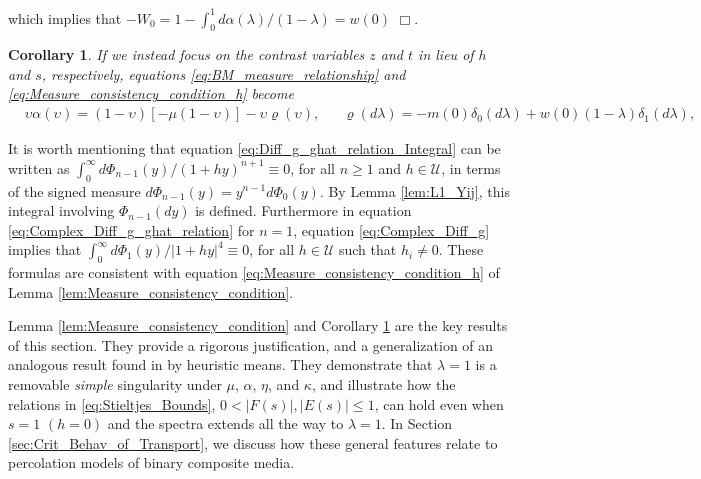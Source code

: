 \documentclass[english,12pt,jmp,graphicx]{revtex4-1}
\newtheorem{corollary}{Corollary}[section]
\begin{document}
%
which implies that $-W_0=1-\int_0^1d\alpha(\lambda)/(1-\lambda)=w(0)$ $\Box$.
%
\begin{corollary}\label{cor:Delta_functions}
%  
  If we instead focus on the contrast variables $z$ and $t$ in lieu of
  $h$ and $s$, respectively, equations
  \eqref{eq:BM_measure_relationship} and
  \eqref{eq:Measure_consistency_condition_h} become  
%
\begin{align}\label{eq:Measure_consistency_condition_z}
%  
 &\upsilon\alpha(\upsilon)=(1-\upsilon)[-\mu(1-\upsilon)] - \upsilon\varrho(\upsilon),
 &&\varrho(d\lambda)=-m(0)\delta_0(d\lambda)+w(0)(1-\lambda)\delta_1(d\lambda),
% 
\end{align}
%  
\end{corollary}
%

 It is worth mentioning 
that equation \eqref{eq:Diff_g_ghat_relation_Integral} can be written
as $\int_0^\infty d\Phi_{n-1}(y)/(1+hy)^{n+1}\equiv0$, for all $n\geq1$ and $h\in\mathcal{U}$, in
terms of the signed measure $d\Phi_{n-1}(y)=y^{n-1}d\Phi_0(y)$. By Lemma
\ref{lem:L1_Yij}, this integral involving 
$\Phi_{n-1}(dy)$ is defined. Furthermore in equation
\eqref{eq:Complex_Diff_g_ghat_relation} for $n=1$, equation
\eqref{eq:Complex_Diff_g} implies that $\int_0^\infty d\Phi_1(y)/|1+hy|^4\equiv0$, for 
all $h\in\mathcal{U}$ such that $h_i\neq0$. These formulas are consistent
with equation \eqref{eq:Measure_consistency_condition_h} of Lemma
\ref{lem:Measure_consistency_condition}.

Lemma \ref{lem:Measure_consistency_condition} and Corollary 
\ref{cor:Delta_functions} are the key results of this section. They
provide a rigorous justification, and a generalization of an
analogous result found in \cite{Day:JPCM-96} by heuristic means. They
demonstrate that $\lambda=1$ is a removable \emph{simple} singularity under
$\mu$, $\alpha$, $\eta$, and $\kappa$, and illustrate how the relations in
\eqref{eq:Stieltjes_Bounds}, $0<|F(s)|,|E(s)|\leq1$, can hold even when
$s=1$ $(h=0)$ and the spectra extends all the way to $\lambda=1$. In Section 
\ref{sec:Crit_Behav_of_Transport}, we discuss how these general
features relate to percolation models of binary composite media. 
       
\end{document}
